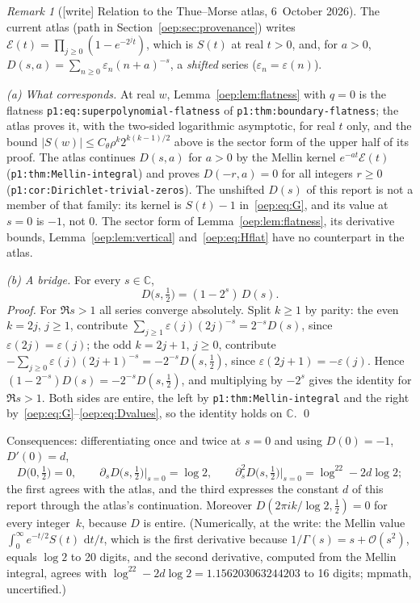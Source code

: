 \documentclass[11pt,letterpaper]{article}
\theoremstyle{remark}\newtheorem{remark}[theorem]{Remark}
\newcommand{\eps}{\varepsilon}
\newcommand{\dd}{\,\mathrm d}
\newcommand{\OO}{\mathcal O}
\newcommand{\file}[1]{\nolinkurl{#1}}
\begin{document}
\begin{remark}[{[write]} Relation to the Thue--Morse atlas, 6~October 2026]\label{oep:rem:atlas}
The current atlas (path in Section~\ref{oep:sec:provenance}) writes
$\mathcal E(t)=\prod_{j\ge0}(1-e^{-2^jt})$, which is $S(t)$ at real $t>0$,
and, for $a>0$, $D(s,a)=\sum_{n\ge0}\eps_n(n+a)^{-s}$, a \emph{shifted}
series ($\eps_n=\eps(n)$).

\emph{(a) What corresponds.} At real $w$, Lemma~\ref{oep:lem:flatness} with
$q=0$ is the flatness \file{p1:eq:superpolynomial-flatness} of
\file{p1:thm:boundary-flatness}; the atlas proves it, with the two-sided
logarithmic asymptotic, for real $t$ only, and the bound
$|S(w)|\le C_\theta\rho^k2^{k(k-1)/2}$ above is the sector form of the upper
half of its proof. The atlas continues $D(s,a)$ for $a>0$ by the Mellin kernel
$e^{-at}\mathcal E(t)$ (\file{p1:thm:Mellin-integral}) and proves
$D(-r,a)=0$ for all integers $r\ge0$
(\file{p1:cor:Dirichlet-trivial-zeros}). The unshifted $D(s)$ of this report
is not a member of that family: its kernel is $S(t)-1$ in~\eqref{oep:eq:G},
and its value at $s=0$ is $-1$, not $0$. The sector form of
Lemma~\ref{oep:lem:flatness}, its derivative bounds,
Lemma~\ref{oep:lem:vertical} and~\eqref{oep:eq:Hflat} have no counterpart
in the atlas.

\emph{(b) A bridge.} For every $s\in\mathbb C$,
\[
 D\bigl(s,\tfrac12\bigr)=(1-2^s)\,D(s).
\]
\emph{Proof.} For $\Re s>1$ all series converge absolutely. Split $k\ge1$ by
parity: the even $k=2j$, $j\ge1$, contribute $\sum_{j\ge1}\eps(j)(2j)^{-s}
=2^{-s}D(s)$, since $\eps(2j)=\eps(j)$; the odd $k=2j+1$, $j\ge0$,
contribute $-\sum_{j\ge0}\eps(j)(2j+1)^{-s}=-2^{-s}D(s,\tfrac12)$, since
$\eps(2j+1)=-\eps(j)$. Hence $(1-2^{-s})D(s)=-2^{-s}D(s,\tfrac12)$, and
multiplying by $-2^s$ gives the identity for $\Re s>1$. Both sides are
entire, the left by \file{p1:thm:Mellin-integral} and the right
by~\eqref{oep:eq:G}--\eqref{oep:eq:Dvalues}, so the identity holds on
$\mathbb C$. \qed

Consequences: differentiating once and twice at $s=0$ and using
$D(0)=-1$, $D'(0)=d$,
\[
 D\bigl(0,\tfrac12\bigr)=0,\qquad
 \partial_sD\bigl(s,\tfrac12\bigr)\big|_{s=0}=\log2,\qquad
 \partial_s^2D\bigl(s,\tfrac12\bigr)\big|_{s=0}=\log^22-2d\log2 ;
\]
the first agrees with the atlas, and the third expresses the constant $d$ of
this report through the atlas's continuation. Moreover
$D(2\pi ik/\log2,\tfrac12)=0$ for every integer~$k$, because $D$ is entire.
(Numerically, at the write: the Mellin value
$\int_0^\infty e^{-t/2}S(t)\,\dd t/t$, which is the first derivative
because $1/\Gamma(s)=s+\OO(s^2)$, equals $\log2$ to 20 digits, and the
second derivative, computed from the Mellin integral, agrees with
$\log^22-2d\log2=1.156203063244203$ to 16 digits; mpmath, uncertified.)


\end{remark}
\end{document}

